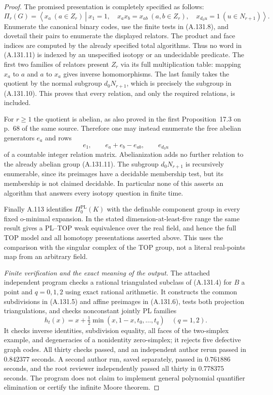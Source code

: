 \begin{proof}
The promised presentation is completely specified as follows:
\[
 \Pi_r(G)=
 \left\langle x_a\ (a\in Z_r)\ \left|\
 x_1=1,\quad x_ax_b=x_{ab}\ (a,b\in Z_r),\quad
 x_{d_0u}=1\ (u\in N_{r+1})\right.\right\rangle.
                                                        \tag{A.131.11}
\]
Enumerate the canonical binary codes, use the finite tests in
(A.131.8), and dovetail their pairs to enumerate the displayed
relators. The product and face indices are computed by the already
specified total algorithms. Thus no word in (A.131.11) is indexed
by an unspecified isotopy or an undecidable predicate.
The first two families of relators present $Z_r$ via its full
multiplication table: mapping $x_a$ to $a$ and $a$ to $x_a$ gives
inverse homomorphisms. The last family takes the quotient by the
normal subgroup $d_0N_{r+1}$, which is precisely the subgroup in
(A.131.10). This proves that every relation, and only the required
relations, is included.

For $r\ge1$ the quotient is abelian, as also proved in the first
Proposition~17.3 on p.~68 of the same source. Therefore one may
instead enumerate the free abelian generators $e_a$ and rows
\[
 e_1,\qquad e_a+e_b-e_{ab},\qquad e_{d_0u}
                                                        \tag{A.131.12}
\]
of a countable integer relation matrix. Abelianization adds no
further relation to the already abelian group (A.131.11).
The subgroup $d_0N_{r+1}$ is recursively enumerable, since its
preimages have a decidable membership test, but its membership is
not claimed decidable. In particular none of this asserts an
algorithm that answers every isotopy question in finite time.

Finally A.113 identifies $\Pi_0^{\mathrm{PL}}(K)$ with the
definable component group in every fixed o-minimal expansion.
In the stated dimension-at-least-five range the same result gives
a PL--TOP weak equivalence over the real field, and hence the full
TOP model and all homotopy presentations asserted above.
This uses the comparison with the singular complex of the TOP
group, not a literal real-points map from an arbitrary field.

\emph{Finite verification and the exact meaning of the output.}
The attached independent program checks a rational triangulated
subclass of (A.131.4) for $B$ a point and $q=0,1,2$ using exact
rational arithmetic. It constructs the common subdivisions in
(A.131.5) and affine preimages in (A.131.6), tests both projection
triangulations, and checks nonconstant jointly PL families
\[
 h_t(x)=x+\tfrac12\min(x,1-x,t_0,\ldots,t_q)
 \quad(q=1,2).
\]
It checks inverse identities, subdivision equality, all faces of the
two-simplex example, and degeneracies of a nonidentity zero-simplex;
it rejects five defective graph codes. All thirty checks passed,
and an independent author rerun passed in $0.842377$ seconds.
A second author run, saved separately, passed in $0.761886$ seconds,
and the root reviewer independently passed all thirty in $0.778375$
seconds.
The program does not claim to implement general polynomial
quantifier elimination or certify the infinite Moore theorem.


\end{proof}
